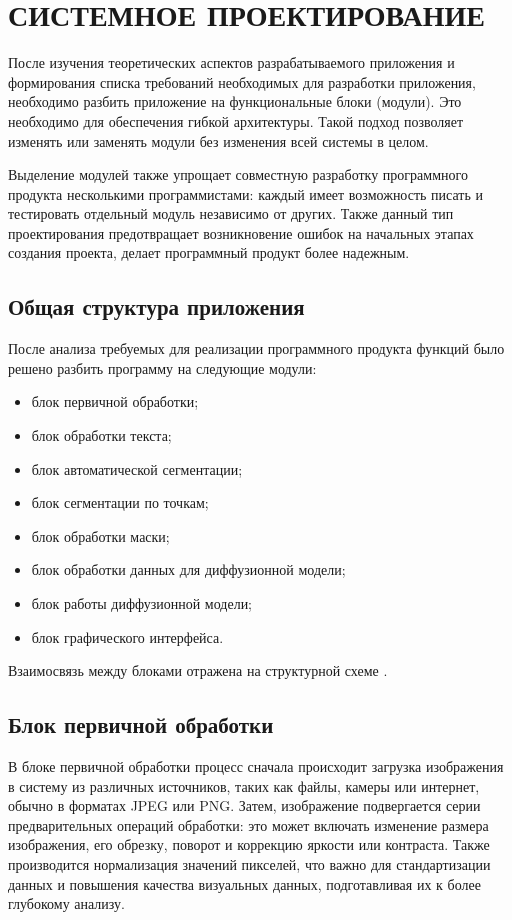 \section{СИСТЕМНОЕ ПРОЕКТИРОВАНИЕ}
\label{sec:sys}

После изучения теоретических аспектов разрабатываемого приложения
и формирования списка требований необходимых для разработки 
приложения, необходимо разбить приложение на функциональные блоки
(модули). Это необходимо для обеспечения гибкой архитектуры. Такой 
подход позволяет изменять или заменять модули без изменения всей системы 
в целом.

Выделение модулей также упрощает совместную разработку программного продукта несколькими программистами: каждый имеет возможность писать и тестировать отдельный модуль независимо от других. Также данный тип проектирования предотвращает возникновение ошибок на начальных этапах создания проекта, делает программный продукт более надежным.

\subsection{Общая структура приложения}

После анализа требуемых для реализации программного продукта функций было решено разбить программу на следующие модули:
\begin{itemize}
    \item блок первичной обработки;
    \item блок обработки текста;
    \item блок автоматической сегментации;
    \item блок сегментации по точкам;
    \item блок обработки маски;
    \item блок обработки данных для диффузионной модели;
    \item блок работы диффузионной модели;
    \item блок графического интерфейса.
\end{itemize}

Взаимосвязь между блоками отражена на структурной схеме \structScheme.

\subsection{Блок первичной обработки}

В блоке первичной обработки процесс сначала происходит загрузка изображения в систему из различных источников, таких как файлы, камеры или интернет, обычно в форматах JPEG или PNG. Затем, изображение подвергается серии предварительных операций обработки: это может включать изменение размера изображения, его обрезку, поворот и коррекцию яркости или контраста. Также производится нормализация значений пикселей, что важно для стандартизации данных и повышения качества визуальных данных, подготавливая их к более глубокому анализу.

